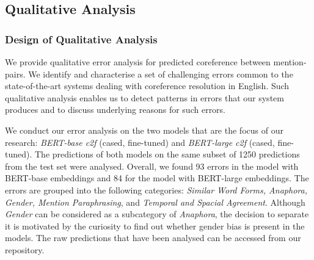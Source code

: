 \documentclass[11pt]{article}
\begin{document}
\subsection{Qualitative Analysis}


\subsubsection{Design of Qualitative Analysis}



We provide qualitative error analysis for predicted coreference between mention-pairs. We identify and characterise a set of challenging errors common to the state-of-the-art systems dealing with coreference resolution in English. Such qualitative analysis enables us to detect patterns in errors that our system produces and to discuss underlying reasons for such errors. 

We conduct our error analysis on the two models that are the focus of our research: \textit{BERT-base c2f} (cased, fine-tuned) and \textit{BERT-large c2f} (cased, fine-tuned). The predictions of both models on the same subset of 1250 predictions from the test set were analysed. Overall, we found 93 errors in the model with BERT-base embeddings and 84 for the model with BERT-large embeddings. The errors are grouped into the following categories: \textit{Similar Word Forms, Anaphora, Gender, Mention Paraphrasing}, and \textit{Temporal and Spacial Agreement}. Although \textit{Gender} can be considered as a subcategory of \textit{Anaphora}, the decision to separate it is motivated by the curiosity to find out whether gender bias is present in the models.
The raw predictions that have been analysed can be accessed from our repository. 
\end{document}
